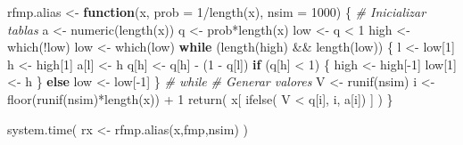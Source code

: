 \documentclass[
]{book}
\newenvironment{Shaded}{\begin{snugshade}}{\end{snugshade}}
\newcommand{\AttributeTok}[1]{\textcolor[rgb]{0.77,0.63,0.00}{#1}}
\newcommand{\CommentTok}[1]{\textcolor[rgb]{0.56,0.35,0.01}{\textit{#1}}}
\newcommand{\ControlFlowTok}[1]{\textcolor[rgb]{0.13,0.29,0.53}{\textbf{#1}}}
\newcommand{\DecValTok}[1]{\textcolor[rgb]{0.00,0.00,0.81}{#1}}
\newcommand{\FunctionTok}[1]{\textcolor[rgb]{0.00,0.00,0.00}{#1}}
\newcommand{\NormalTok}[1]{#1}
\newcommand{\OtherTok}[1]{\textcolor[rgb]{0.56,0.35,0.01}{#1}}
\newcommand{\SpecialCharTok}[1]{\textcolor[rgb]{0.00,0.00,0.00}{#1}}
\theoremstyle{break}
\theoremstyle{definition}
\theoremstyle{definition}
\theoremstyle{definition}
\theoremstyle{definition}
\theoremstyle{remark}
\begin{document}
\begin{Shaded}
\begin{Highlighting}[]
\NormalTok{rfmp.alias }\OtherTok{\textless{}{-}} \ControlFlowTok{function}\NormalTok{(x, }\AttributeTok{prob =} \DecValTok{1}\SpecialCharTok{/}\FunctionTok{length}\NormalTok{(x), }\AttributeTok{nsim =} \DecValTok{1000}\NormalTok{) \{}
  \CommentTok{\# Inicializar tablas}
\NormalTok{  a }\OtherTok{\textless{}{-}} \FunctionTok{numeric}\NormalTok{(}\FunctionTok{length}\NormalTok{(x))}
\NormalTok{  q }\OtherTok{\textless{}{-}}\NormalTok{ prob}\SpecialCharTok{*}\FunctionTok{length}\NormalTok{(x)}
\NormalTok{  low }\OtherTok{\textless{}{-}}\NormalTok{ q }\SpecialCharTok{\textless{}} \DecValTok{1}
\NormalTok{  high }\OtherTok{\textless{}{-}} \FunctionTok{which}\NormalTok{(}\SpecialCharTok{!}\NormalTok{low)}
\NormalTok{  low }\OtherTok{\textless{}{-}} \FunctionTok{which}\NormalTok{(low)}
  \ControlFlowTok{while}\NormalTok{ (}\FunctionTok{length}\NormalTok{(high) }\SpecialCharTok{\&\&} \FunctionTok{length}\NormalTok{(low)) \{}
\NormalTok{    l }\OtherTok{\textless{}{-}}\NormalTok{ low[}\DecValTok{1}\NormalTok{]}
\NormalTok{    h }\OtherTok{\textless{}{-}}\NormalTok{ high[}\DecValTok{1}\NormalTok{]}
\NormalTok{    a[l] }\OtherTok{\textless{}{-}}\NormalTok{ h}
\NormalTok{    q[h] }\OtherTok{\textless{}{-}}\NormalTok{ q[h] }\SpecialCharTok{{-}}\NormalTok{ (}\DecValTok{1} \SpecialCharTok{{-}}\NormalTok{ q[l])}
    \ControlFlowTok{if}\NormalTok{ (q[h] }\SpecialCharTok{\textless{}} \DecValTok{1}\NormalTok{) \{}
\NormalTok{      high }\OtherTok{\textless{}{-}}\NormalTok{ high[}\SpecialCharTok{{-}}\DecValTok{1}\NormalTok{]}
\NormalTok{      low[}\DecValTok{1}\NormalTok{] }\OtherTok{\textless{}{-}}\NormalTok{ h}
\NormalTok{    \} }\ControlFlowTok{else}\NormalTok{ low }\OtherTok{\textless{}{-}}\NormalTok{ low[}\SpecialCharTok{{-}}\DecValTok{1}\NormalTok{]}
\NormalTok{  \} }\CommentTok{\# while}
  \CommentTok{\# Generar valores}
\NormalTok{  V }\OtherTok{\textless{}{-}} \FunctionTok{runif}\NormalTok{(nsim)}
\NormalTok{  i }\OtherTok{\textless{}{-}} \FunctionTok{floor}\NormalTok{(}\FunctionTok{runif}\NormalTok{(nsim)}\SpecialCharTok{*}\FunctionTok{length}\NormalTok{(x)) }\SpecialCharTok{+} \DecValTok{1}
  \FunctionTok{return}\NormalTok{( x[ }\FunctionTok{ifelse}\NormalTok{( V }\SpecialCharTok{\textless{}}\NormalTok{ q[i], i, a[i]) ] )}
\NormalTok{\}}


\FunctionTok{system.time}\NormalTok{( rx }\OtherTok{\textless{}{-}} \FunctionTok{rfmp.alias}\NormalTok{(x,fmp,nsim) )}
\end{Highlighting}
\end{Shaded}
\end{document}

